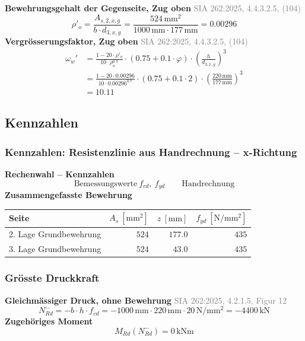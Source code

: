 \documentclass[11pt,a4paper]{article}
\newcommand{\normref}[1]{{\small\textcolor{gray}{#1}}}
\begin{document}
\noindent\textbf{Bewehrungsgehalt der Gegenseite, Zug oben} \hfill \normref{SIA 262:2025, 4.4.3.2.5, (104)}
\begin{equation*}
\rho'_{o} = \frac{A_{s,2,x,g}}{b \cdot d_{3,x,g}} = \frac{524\,\mathrm{mm}^{2}}{1000\,\mathrm{mm} \cdot 177\,\mathrm{mm}} = 0.00296
\end{equation*}
\noindent\textbf{Vergrösserungsfaktor, Zug oben} \hfill \normref{SIA 262:2025, 4.4.3.2.5, (104)}
\begin{equation*}
\begin{aligned}
  \omega_w' &= \frac{1 - 20 \cdot \rho'_{o}}{10 \cdot \rho_{o}^{0.7}} \cdot \left(0.75 + 0.1 \cdot \varphi\right) \cdot \left(\frac{h}{d_{3,x,g}}\right)^{3} \\
  &= \frac{1 - 20 \cdot 0.00296}{10 \cdot 0.00296^{0.7}} \cdot \left(0.75 + 0.1 \cdot 2\right) \cdot \left(\frac{220\,\mathrm{mm}}{177\,\mathrm{mm}}\right)^{3} \\
  &= 10.11
\end{aligned}
\end{equation*}
\subsection{Kennzahlen}
\subsubsection{Kennzahlen: Resistenzlinie aus Handrechnung – x-Richtung}
\noindent\textbf{Rechenwahl – Kennzahlen}
\begin{equation*}
\text{Bemessungswerte}\ f_{cd},\ f_{yd} \qquad \text{Handrechnung}
\end{equation*}
\noindent\textbf{Zusammengefasste Bewehrung}
\begin{longtable}{lrrr}
\hline
Seite & $A_s\ [\mathrm{mm}^2]$ & $z\ [\mathrm{mm}]$ & $f_{yd}\ [\mathrm{N/mm^2}]$ \\
\hline
\endhead
2. Lage Grundbewehrung & $524$ & $177.0$ & $435$ \\
3. Lage Grundbewehrung & $524$ & $43.0$ & $435$ \\
\hline
\end{longtable}
\subsubsection{Grösste Druckkraft}
\noindent\textbf{Gleichmässiger Druck, ohne Bewehrung} \hfill \normref{SIA 262:2025, 4.2.1.5, Figur 12}
\begin{equation*}
N_{Rd}^{-} = -b \cdot h \cdot f_{cd} = -1000\,\mathrm{mm} \cdot 220\,\mathrm{mm} \cdot 20\,\mathrm{N}/\mathrm{mm}^{2} = -4400\,\mathrm{kN}
\end{equation*}
\noindent\textbf{Zugehöriges Moment}
\begin{equation*}
M_{Rd}(N_{Rd}^{-}) = 0\,\mathrm{kNm}
\end{equation*}
\end{document}

